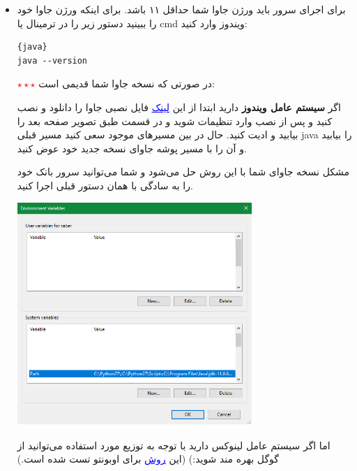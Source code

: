 \documentclass[]{article}
\begin{document}
\begin{itemize}

\item
برای اجرای سرور باید ورژن جاوا شما حداقل ۱۱ باشد. برای اینکه ورژن جاوا خود را ببینید دستور زیر را در ترمینال یا cmd ویندوز وارد کنید:

\begin{latin}

\begin{lstlisting}{java}
java --version
\end{lstlisting}

\end{latin}

\item[\textcolor{red}{$\star \star \star$}]
در صورتی که نسخه جاوا شما قدیمی است:

اگر \textbf{سیستم عامل ویندوز  }دارید ابتدا از این
 \href{http://dl.yasdl.com/2020/Software/Java.Development.Kit.11.0.6.x64_YasDL.com.rar?a}{\textcolor{blue}{\underline{{لینک}}}} فایل نصبی جاوا را دانلود و نصب کنید و پس از نصب وارد تنظیمات  شوید و در قسمت  طبق تصویر صفحه بعد  را بیابید و ادیت کنید. حال در بین مسیرهای موجود سعی کنید مسیر قبلی java را بیابید و آن را با مسیر پوشه  جاوای نسخه جدید خود عوض کنید.



مشکل نسخه جاوای شما با این روش حل می‌شود و شما می‌توانید سرور بانک خود را به سادگی با همان دستور قبلی اجرا کنید.

\begin{center}
\includegraphics[width=0.7\textwidth]{images/1.png}
\end{center}


اما اگر سیستم عامل لینوکس دارید با توجه به توزیع مورد استفاده می‌توانید از گوگل بهره مند شوید:) (این \href{https://linuxize.com/post/install-java-on-ubuntu-18-04/}{\textcolor{blue}{\underline{{روش}}}} برای اوبونتو تست شده است.)


\end{itemize}
\end{document}
